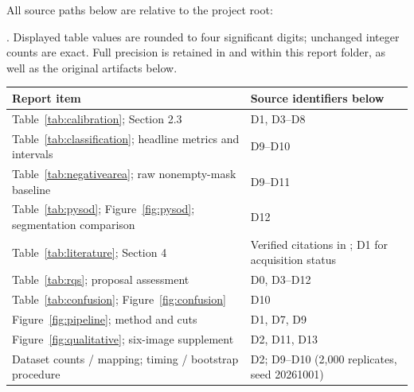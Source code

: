 All source paths below are relative to the project root:\par
{}.
Displayed table values are rounded to four significant digits; unchanged integer counts are exact. Full precision is retained in  and  within this report folder, as well as the original artifacts below.

\smallskip
\begin{tabularx}{\textwidth}{L{6.3cm}Y}
\toprule
\textbf{Report item} & \textbf{Source identifiers below} \\
\midrule
Table~\ref{tab:calibration}; Section 2.3 & D1, D3--D8 \\
Table~\ref{tab:classification}; headline metrics and intervals & D9--D10 \\
Table~\ref{tab:negativearea}; raw nonempty-mask baseline & D9--D11 \\
Table~\ref{tab:pysod}; Figure~\ref{fig:pysod}; segmentation comparison & D12 \\
Table~\ref{tab:literature}; Section 4 & Verified citations in ; D1 for acquisition status \\
Table~\ref{tab:rqs}; proposal assessment & D0, D3--D12 \\
Table~\ref{tab:confusion}; Figure~\ref{fig:confusion} & D10 \\
Figure~\ref{fig:pipeline}; method and cuts & D1, D7, D9 \\
Figure~\ref{fig:qualitative}; six-image supplement & D2, D11, D13 \\
Dataset counts / mapping; timing / bootstrap procedure & D2; D9--D10 (2,000 replicates, seed 20261001) \\
\bottomrule
\end{tabularx}

